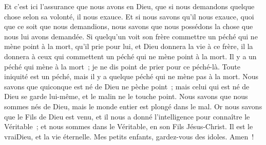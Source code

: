 \begin{multicols}{2}
Et c'est ici l'assurance que nous avons en Dieu, que si nous demandons quelque chose selon sa volonté, il nous exauce.
Et si nous savons qu'il nous exauce, quoi que ce soit que nous demandions, nous savons que nous possédons la chose que nous lui avons demandée.
Si quelqu'un voit son frère commettre un péché qui ne mène point à la mort, qu'il prie pour lui, et Dieu donnera la vie à ce frère, il la donnera à ceux qui commettent un péché qui ne mène point à la mort. Il y a un péché qui mène à la mort~; je ne dis point de prier pour ce péché-là.
Toute iniquité est un péché, mais il y a quelque péché qui ne mène pas à la mort.
Nous savons que quiconque est né de Dieu ne pèche point~; mais celui qui est né de Dieu se garde lui-même, et le malin ne le touche point.
Nous savons que nous sommes nés de Dieu, mais le monde entier est plongé dans le mal.
Or nous savons que le Fils de Dieu est venu, et il nous a donné l'intelligence pour connaître le Véritable~; et nous sommes dans le Véritable, en son Fils Jésus-Christ. Il est le vraiDieu, et la vie éternelle.
Mes petits enfants, gardez-vous des idoles. Amen~!
\PPE{}
\end{multicols}

